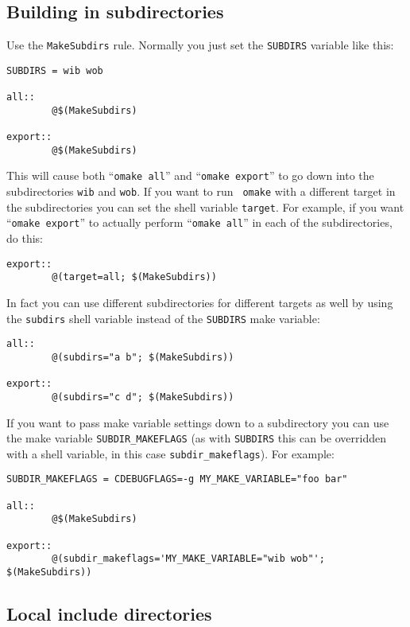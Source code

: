 \documentclass[11pt]{article}
\begin{document}
\subsection{Building in subdirectories}

Use the {\tt MakeSubdirs} rule.  Normally you just set the {\tt SUBDIRS}
variable like this:

\begin{verbatim}
SUBDIRS = wib wob

all::
        @$(MakeSubdirs)

export::
        @$(MakeSubdirs)
\end{verbatim}

This will cause both ``{\tt omake all}'' and ``{\tt omake export}'' to go down
into the subdirectories {\tt wib} and {\tt wob}.  If you want to run {\tt
omake} with a different target in the subdirectories you can set the shell
variable {\tt target}.  For example, if you want ``{\tt omake export}'' to
actually perform ``{\tt omake all}'' in each of the subdirectories, do this:

\begin{verbatim}
export::
        @(target=all; $(MakeSubdirs))
\end{verbatim}

In fact you can use different subdirectories for different targets as well by
using the {\tt subdirs} shell variable instead of the {\tt SUBDIRS} make
variable:

\begin{verbatim}
all::
        @(subdirs="a b"; $(MakeSubdirs))

export::
        @(subdirs="c d"; $(MakeSubdirs))
\end{verbatim}

If you want to pass make variable settings down to a subdirectory you can use
the make variable {\tt SUBDIR\_MAKEFLAGS} (as with {\tt SUBDIRS} this can be
overridden with a shell variable, in this case {\tt subdir\_makeflags}).  For
example:

\begin{verbatim}
SUBDIR_MAKEFLAGS = CDEBUGFLAGS=-g MY_MAKE_VARIABLE="foo bar"

all::
        @$(MakeSubdirs)

export::
        @(subdir_makeflags='MY_MAKE_VARIABLE="wib wob"'; $(MakeSubdirs))
\end{verbatim}


\subsection{Local include directories}
\end{document}
